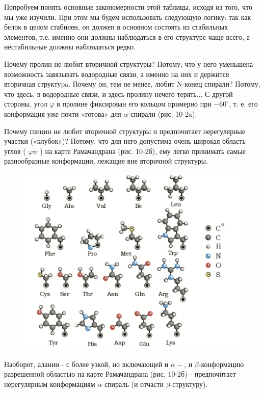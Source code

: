 \documentclass[
11pt,%
tightenlines,%
twoside,%
onecolumn,%
nofloats,%
nobibnotes,%
nofootinbib,%
superscriptaddress,%
noshowpacs,%
centertags]%
{revtex4}
\begin{document}
Попробуем понять основные закономерности этой таблицы, исходя из того, что мы уже изучили. При этом мы будем использовать следующую логику: так как белок в целом стабилен, он должен в основном состоять из стабильных элементов, т.е. именно они должны наблюдаться в его структуре чаще всего, а нестабильные должны наблюдаться редко.

Почему пролин не любит вторичной структуры? Потому, что у него уменьшена возможность завязывать водородные связи, а именно на них и держится вторичная структуpa. Почему он, тем не менее, любит N-конец спирали? Потому, что здесь, в водородные связи, и здесь пролину нечего терять... С другой стороны, угол $\varphi$ в пролине фиксирован его кольцом примерно при $-60^{\circ}$, т. е. его конформация уже почти «готова» для $\alpha$-спирали (рис. 10-2a).


Почему глицин не любит вторичной структуры и предпочитает нерегулярные участки («клубок»)? Потому, что для него допустима очень широкая область углов ( $\varphi \psi$ ) на карте Рамачандрана (рис. 10-2б), ему легко принимать самые разнообразные конформации, лежащие вне вторичной структуры.

\begin{figure}
	\centering
	\includegraphics[scale=0.3]{amin}
	\caption{}
\end{figure}
Наоборот, аланин - с более узкой, но включающей и $\alpha-$, и $\beta$-конформацию разрешенной областью на карте Рамачандрана (рис. 10-2б) - предпочитает нерегулярным конформациям $\alpha$-спираль (и отчасти $\beta$-структуру).
\end{document}
